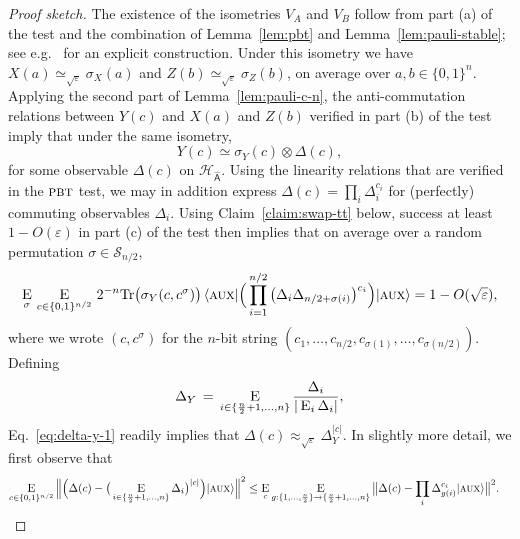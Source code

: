 \documentclass[11pt]{article}
\theoremstyle{remark}
\theoremstyle{definition}
\newcommand{\ket}[1]{|#1\rangle}
\newcommand{\bra}[1]{\langle#1|}
\newcommand{\Tr}{\mbox{\rm Tr}}
\newcommand{\Es}[1]{\ensuremath{\mathop{\textsc{E}}_{#1}}}
\newcommand{\reg}[1]{{\textsf{#1}}}
\newcommand{\mH}{\mathcal{H}}
\newcommand{\eps}{\varepsilon}
\newcommand{\pbt}{\textsc{pbt}}
\newcommand{\aux}{\textsc {aux}}
\begin{document}
\begin{proof}[Proof sketch]
The existence of the isometries $V_A$ and $V_B$ follow from part (a) of the test and the combination of Lemma~\ref{lem:pbt} and Lemma~\ref{lem:pauli-stable}; see e.g.~\cite{natarajan2016robust} for an explicit construction. 
 Under this isometry we have $X(a) \simeq_{\sqrt{\eps}} \sigma_X(a)$ and $Z(b)\simeq_{\sqrt{\eps}} \sigma_Z(b)$, on average over $a,b\in\{0,1\}^n$. Applying the second part of Lemma~\ref{lem:pauli-c-n},  the  anti-commutation relations between $Y(c)$ and $X(a)$ and $Z(b)$ verified in part (b) of the test imply that under the same isometry,
$$ Y(c) \simeq \sigma_Y(c) \otimes {\Delta}(c),$$
for some observable ${\Delta}(c)$ on ${\mH}_{\hat{\reg{A}}}$. Using the linearity relations that are verified in the $\pbt$ test, we may in addition express $\Delta(c) = \prod_i \Delta_{i}^{c_i}$ for (perfectly) commuting observables $\Delta_i$. Using Claim~\ref{claim:swap-tt} below, success at least $1-O(\eps)$ in part (c) of the test then implies that on average over a random permutation $\sigma \in \mathcal{S}_{n/2}$, 
\begin{equation}\label{eq:delta-y-1}
 \Es{\sigma} \,\Es{c\in\{0,1\}^{n/2}}\,2^{-n}\Tr \big(\sigma_Y(c,c^\sigma)\big)\,\bra{\aux} \Big( \prod_{i=1}^{n/2}\big( \Delta_i \Delta_{n/2+ \sigma(i)} \big)^{c_i} \Big) \ket{\aux}  = 1- O(\sqrt{\eps}),
\end{equation}
where we wrote $(c,c^\sigma)$ for the $n$-bit string $(c_1,\ldots,c_{n/2},c_{\sigma(1)},\ldots,c_{\sigma(n/2)})$. Defining
 \begin{equation}\label{eq:delta-y-3}
\Delta_Y \,=\, \Es{i\in\{\frac{n}{2}+1,\ldots,n\}} \frac{\Delta_i}{|\Es{i} \Delta_i|},
\end{equation}
Eq.~\eqref{eq:delta-y-1} readily implies that $\Delta(c) \approx_{\sqrt{\eps}} \Delta_Y^{|c|}$. In slightly more detail, we first observe that
\begin{align}
\Es{c\in\{0,1\}^{n/2}} \Big\| \Big(\Delta(c) - \big(\Es{i\in\{\frac{n}{2}+1,\ldots,n\}} \Delta_{i}\big)^{|c|}\Big) \ket{\aux} \Big\|^2&\leq 
\Es{c} \Es{g:\{1,\ldots,\frac{n}{2}\}\to\{\frac{n}{2}+1,\ldots,n\}} \big\| \Delta(c) - \prod_i \Delta_{g(i)}^{c_i} \ket{\aux} \big\|^2.\label{eq:delta-y-2}

\end{align}
\end{proof}
\end{document}
